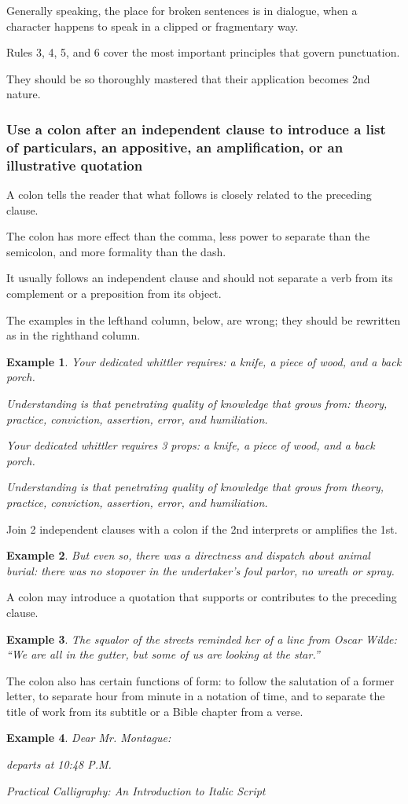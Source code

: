 \documentclass{article}
\newtheorem{example}{Example}
\begin{document}
Generally speaking, the place for broken sentences is in dialogue, when a character happens to speak in a clipped or fragmentary way.

%
Rules 3, 4, 5, and 6 cover the most important principles that govern punctuation.

They should be so thoroughly mastered that their application becomes 2nd nature.


\subsubsection{Use a colon after an independent clause to introduce a list of particulars, an appositive, an amplification, or an illustrative quotation}
A colon tells the reader that what follows is closely related to the preceding clause.

The colon has more effect than the comma, less power to separate than the semicolon, and more formality than the dash.

It usually follows an independent clause and should not separate a verb from its complement or a preposition from its object.

The examples in the lefthand column, below, are wrong; they should be rewritten as in the righthand column.
\begin{example}
	Your dedicated whittler requires: a knife, a piece of wood, and a back porch.
	
	Understanding is that penetrating quality of knowledge that grows from: theory, practice, conviction, assertion, error, and humiliation.
	
	Your dedicated whittler requires 3 props: a knife, a piece of wood, and a back porch.
	
	Understanding is that penetrating quality of knowledge that grows from theory, practice, conviction, assertion, error, and humiliation.
\end{example}
Join 2 independent clauses with a colon if the 2nd interprets or amplifies the 1st.
\begin{example}
	But even so, there was a directness and dispatch about animal burial: there was no stopover in the undertaker's foul parlor, no wreath or spray.
\end{example}
A colon may introduce a quotation that supports or contributes to the preceding clause.
\begin{example}
	The squalor of the streets reminded her of a line from Oscar Wilde: ``We are all in the gutter, but some of us are looking at the star.''
\end{example}
The colon also has certain functions of form: to follow the salutation of a former letter, to separate hour from minute in a notation of time, and to separate the title of work from its subtitle or a Bible chapter from a verse.
\begin{example}
	Dear Mr. Montague:
	
	departs at 10:48 P.M.
	
	Practical Calligraphy: An Introduction to Italic Script
\end{example}
\end{document}
